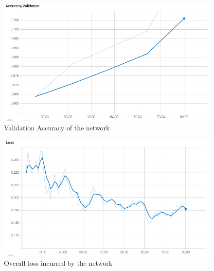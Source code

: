 \documentclass[journal]{IEEEtran}
\begin{document}
\begin{figure}[ht!]
    \centering
    \includegraphics[scale = 0.3]{Acc_76_3.png}
    \caption{Validation Accuracy of the network}
    \label{fig:Acc3}
\end{figure}

\begin{figure}[ht!]
    \centering
    \includegraphics[scale = 0.3]{Acc_76_4.png}
    \caption{Overall loss incurred by the network}
    \label{fig:loss1}
\end{figure}
\end{document}
